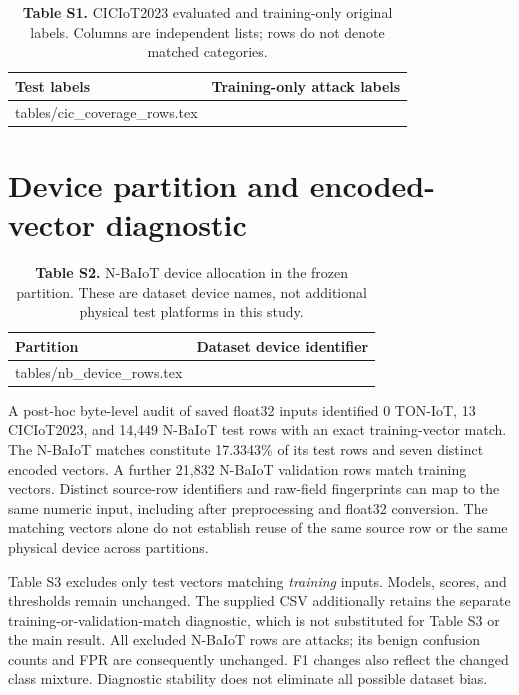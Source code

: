 \documentclass[10pt,a4paper]{article}
\makeatletter
\newcommand{\tableinput}[1]{\@@input #1.tex }
\makeatother
\begin{document}
\begin{table}[h!]
\centering\small
\caption*{\textbf{Table S1.} CICIoT2023 evaluated and training-only original labels. Columns are independent lists; rows do not denote matched categories.}
\begin{tabular}{ll}\toprule
Test labels & Training-only attack labels\\\midrule
\tableinput{tables/cic_coverage_rows}
\bottomrule\end{tabular}
\end{table}

\clearpage
\section{Device partition and encoded-vector diagnostic}
\begin{table}[h!]
\centering\small
\caption*{\textbf{Table S2.} N-BaIoT device allocation in the frozen partition. These are dataset device names, not additional physical test platforms in this study.}
\begin{tabular}{ll}\toprule
Partition & Dataset device identifier\\\midrule
\tableinput{tables/nb_device_rows}
\bottomrule\end{tabular}
\end{table}

A post-hoc byte-level audit of saved float32 inputs identified 0 TON-IoT, 13 CICIoT2023, and 14,449 N-BaIoT test rows with an exact training-vector match. The N-BaIoT matches constitute 17.3343\% of its test rows and seven distinct encoded vectors. A further 21,832 N-BaIoT validation rows match training vectors. Distinct source-row identifiers and raw-field fingerprints can map to the same numeric input, including after preprocessing and float32 conversion. The matching vectors alone do not establish reuse of the same source row or the same physical device across partitions.

Table S3 excludes only test vectors matching \emph{training} inputs. Models, scores, and thresholds remain unchanged. The supplied CSV additionally retains the separate training-or-validation-match diagnostic, which is not substituted for Table S3 or the main result. All excluded N-BaIoT rows are attacks; its benign confusion counts and FPR are consequently unchanged. F1 changes also reflect the changed class mixture. Diagnostic stability does not eliminate all possible dataset bias.
\end{document}
